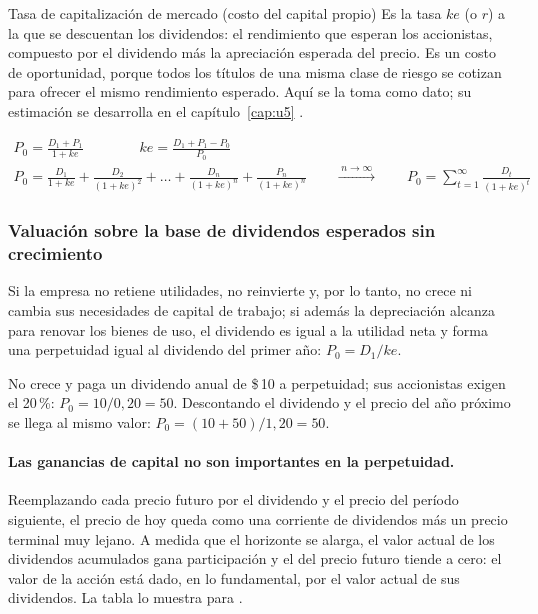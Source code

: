 \begin{definicion}{Tasa de capitalización de mercado (costo del capital propio)}
Es la tasa $ke$ (o $r$) a la que se descuentan los dividendos: el rendimiento que esperan los accionistas, compuesto por el dividendo más la apreciación esperada del precio. Es un costo de oportunidad, porque todos los títulos de una misma clase de riesgo se cotizan para ofrecer el mismo rendimiento esperado. Aquí se la toma como dato; su estimación se desarrolla en el capítulo~\ref{cap:u5} .
\end{definicion}

\begin{formulaBox}
\[
\begin{gathered}
P_0 = \frac{D_1 + P_1}{1+ke}
\qquad\qquad
ke = \frac{D_1 + P_1 - P_0}{P_0}
\\[4pt]
P_0 = \frac{D_1}{1+ke} + \frac{D_2}{(1+ke)^{2}} + \dots + \frac{D_n}{(1+ke)^{n}} + \frac{P_n}{(1+ke)^{n}}
\qquad\xrightarrow{\;n\to\infty\;}\qquad
P_0 = \sum_{t=1}^{\infty}\frac{D_t}{(1+ke)^{t}}
\end{gathered}
\]
\end{formulaBox}

\subsubsection{Valuación sobre la base de dividendos esperados sin crecimiento}

Si la empresa no retiene utilidades, no reinvierte y, por lo tanto, no crece ni cambia sus necesidades de capital de trabajo; si además la depreciación alcanza para renovar los bienes de uso, el dividendo es igual a la utilidad neta y forma una perpetuidad igual al dividendo del primer año: $P_0 = D_1/ke$.

\begin{ejemplo}[Calypso S.\,A.]
No crece y paga un dividendo anual de \$\,10 a perpetuidad; sus accionistas exigen el 20\,\%: $P_0 = 10/0{,}20 = 50$. Descontando el dividendo y el precio del año próximo se llega al mismo valor: $P_0 = (10 + 50)/1{,}20 = 50$.
\end{ejemplo}

\paragraph{Las ganancias de capital no son importantes en la perpetuidad.} Reemplazando cada precio futuro por el dividendo y el precio del período siguiente, el precio de hoy queda como una corriente de dividendos más un precio terminal muy lejano. A medida que el horizonte se alarga, el valor actual de los dividendos acumulados gana participación y el del precio futuro tiende a cero: el valor de la acción está dado, en lo fundamental, por el valor actual de sus dividendos. La tabla lo muestra para .

